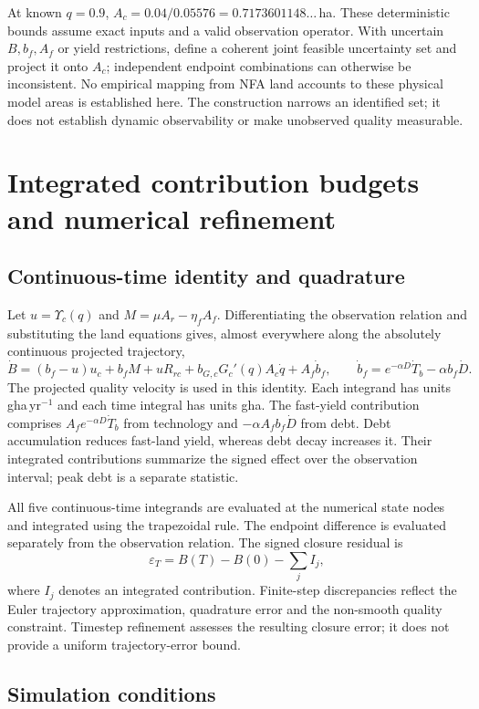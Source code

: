 \documentclass[11pt,a4paper]{article}
\newcommand{\Ups}{\Upsilon_c}
\begin{document}
At known $q=0.9$, $A_c=0.04/0.05576=0.7173601148\ldots$\,ha. These deterministic bounds assume exact inputs and a valid observation operator. With uncertain $B,b_f,A_f$ or yield restrictions, define a coherent joint feasible uncertainty set and project it onto $A_c$; independent endpoint combinations can otherwise be inconsistent. No empirical mapping from NFA land accounts to these physical model areas is established here. The construction narrows an identified set; it does not establish dynamic observability or make unobserved quality measurable.

\section{Integrated contribution budgets and numerical refinement}\label{si:c13budget}

\subsection{Continuous-time identity and quadrature}

Let $u=\Ups(q)$ and $M=\mu A_r-\eta_fA_f$. Differentiating the observation relation and substituting the land equations gives, almost everywhere along the absolutely continuous projected trajectory,
\[
\dot B=(b_f-u)u_c+b_fM+uR_{rc}+b_{G,c}G_c'(q)A_c\dot q+A_f\dot b_f,
\qquad
\dot b_f=e^{-\alpha D}\dot T_b-\alpha b_f\dot D.
\]
The projected quality velocity is used in this identity. Each integrand has units gha\,yr$^{-1}$ and each time integral has units gha. The fast-yield contribution comprises $A_fe^{-\alpha D}\dot T_b$ from technology and $-\alpha A_fb_f\dot D$ from debt. Debt accumulation reduces fast-land yield, whereas debt decay increases it. Their integrated contributions summarize the signed effect over the observation interval; peak debt is a separate statistic.

All five continuous-time integrands are evaluated at the numerical state nodes and integrated using the trapezoidal rule. The endpoint difference is evaluated separately from the observation relation. The signed closure residual is
\[
\varepsilon_T=B(T)-B(0)-\sum_j I_j,
\]
where $I_j$ denotes an integrated contribution. Finite-step discrepancies reflect the Euler trajectory approximation, quadrature error and the non-smooth quality constraint. Timestep refinement assesses the resulting closure error; it does not provide a uniform trajectory-error bound.

\subsection{Simulation conditions}
\end{document}
